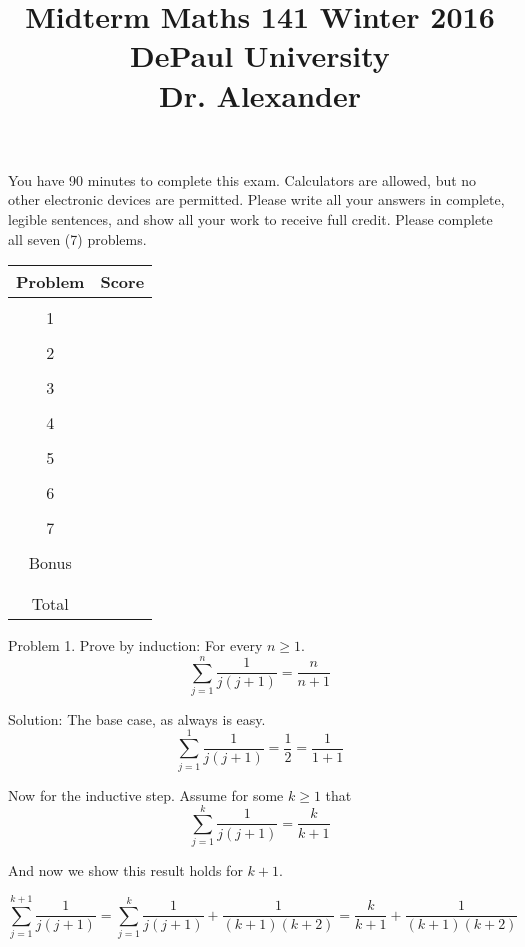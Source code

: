\documentclass[16 pt]{amsart}
\theoremstyle{definition}
\theoremstyle{remark}
\numberwithin{equation}{subsection}
\begin{document}
\title{Midterm Maths 141 Winter 2016 \\ DePaul University\\Dr. Alexander}
\maketitle
You have 90 minutes to complete this exam.  Calculators are allowed, but no other electronic devices are permitted.  Please write all your answers in complete, legible sentences, and show all your work to receive full credit.  Please complete all seven (7) problems.


\begin{center}
  \begin{tabular}{ c | c }
    Problem & Score\\
    \hline
    &\\
    1&\\
    &\\
    2&\\
    &\\
    3&\\
    &\\
    4&\\
    &\\
    5&\\
    &\\
    6&\\
    &\\
    7&\\
    &\\
    Bonus&\\
    &\\
    \hline 
    &\\    
    Total& 
 \end{tabular}
\end{center}

\newpage 
Problem 1. Prove by induction: For every $n\ge 1$.
\[
\sum_{j=1}^{n} \frac{1}{j(j+1)} = \frac{n}{n+1}
\]

\vspace{.5in}

Solution: The base case, as always is easy.
\[
\sum_{j=1}^{1} \frac{1}{j(j+1)} = \frac{1}{2} = \frac{1}{1+1}
\]


Now for the inductive step.  Assume for some $k\ge 1$ that
\[
\sum_{j=1}^{k} \frac{1}{j(j+1)} = \frac{k}{k+1}
\]

And now we show this result holds for $k+1$.

\[
\sum_{j=1}^{k+1} \frac{1}{j(j+1)} = \sum_{j=1}^{k} \frac{1}{j(j+1)}  + \frac{1}{(k+1)(k+2)} = \frac{k}{k+1} + \frac{1}{(k+1)(k+2)}
\]
\end{document}
